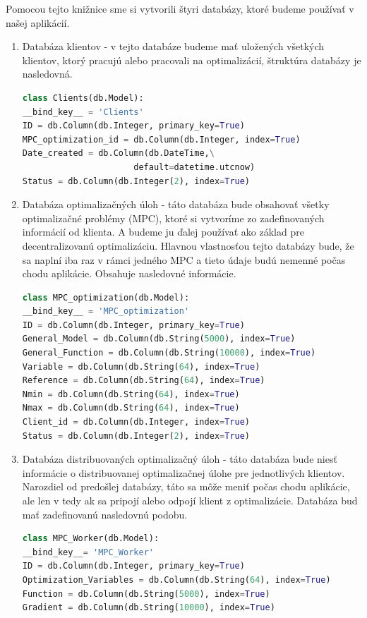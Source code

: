 Pomocou tejto knižnice sme si vytvorili štyri databázy, ktoré budeme používať v našej aplikácií. 
\label{DB:Klient}
\begin{enumerate}
\item{ Databáza klientov - v tejto databáze budeme mať uložených všetkých klientov, ktorý pracujú alebo pracovali na optimalizácií, štruktúra databázy je nasledovná.
\begin{lstlisting}[language=Python]
class Clients(db.Model):
__bind_key__ = 'Clients'
ID = db.Column(db.Integer, primary_key=True)
MPC_optimization_id = db.Column(db.Integer, index=True)
Date_created = db.Column(db.DateTime,\
                      default=datetime.utcnow)
Status = db.Column(db.Integer(2), index=True) 
\end{lstlisting}
}
\label{DB:OPT}
\item{ Databáza optimalizačných úloh - táto databáza bude obsahovať všetky optimalizačné problémy (MPC), ktoré si vytvoríme zo zadefinovaných informácií od klienta. A budeme ju ďalej používať ako základ pre decentralizovanú optimalizáciu. Hlavnou vlastnosťou tejto databázy bude, že sa naplní iba raz v rámci jedného MPC a tieto údaje budú nemenné počas chodu aplikácie. Obsahuje nasledovné informácie.
\begin{lstlisting}[language=Python]
class MPC_optimization(db.Model):
__bind_key__ = 'MPC_optimization'
ID = db.Column(db.Integer, primary_key=True)
General_Model = db.Column(db.String(5000), index=True)
General_Function = db.Column(db.String(10000), index=True)
Variable = db.Column(db.String(64), index=True)
Reference = db.Column(db.String(64), index=True)
Nmin = db.Column(db.String(64), index=True)
Nmax = db.Column(db.String(64), index=True)
Client_id = db.Column(db.Integer, index=True)
Status = db.Column(db.Integer(2), index=True)
\end{lstlisting}
}
\label{DB:WORKER}
\item{ Databáza distribuovaných optimalizačný úloh - táto databáza bude niesť informácie o distribuovanej optimalizačnej úlohe pre jednotlivých klientov. Narozdiel od predošlej databázy, táto sa môže meniť počas chodu aplikácie, ale len v tedy ak sa pripojí alebo odpojí klient z optimalizácie. Databáza bud mať zadefinovanú nasledovnú podobu. 
\begin{lstlisting}[language=Python]
class MPC_Worker(db.Model):
__bind_key__= 'MPC_Worker'
ID = db.Column(db.Integer, primary_key=True)
Optimization_Variables = db.Column(db.String(64), index=True)
Function = db.Column(db.String(5000), index=True)
Gradient = db.Column(db.String(10000), index=True)

\end{lstlisting}}
\end{enumerate}
